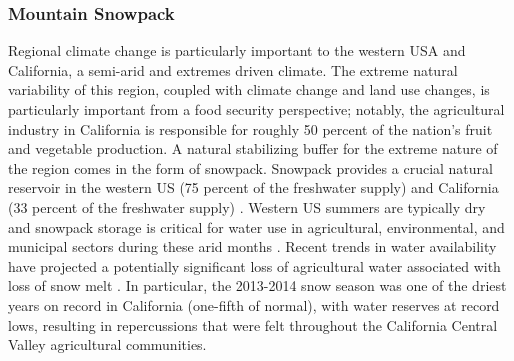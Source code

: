 \documentclass[11pt]{article}
\begin{document}
\subsubsection{Mountain Snowpack}

Regional climate change is particularly important to the western USA and California, a semi-arid and extremes driven climate.  The extreme natural variability of this region, coupled with climate change and land use changes, is particularly important from a food security perspective; notably, the agricultural industry in California is responsible for roughly 50 percent of the nation's fruit and vegetable production.  A natural stabilizing buffer for the extreme nature of the region comes in the form of snowpack. Snowpack provides a crucial natural reservoir in the western US (75 percent of the freshwater supply) and California (33 percent of the freshwater supply) \citep{cayan1996interannual}.  Western US summers are typically dry and snowpack storage is critical for water use in agricultural, environmental, and municipal sectors during these arid months \citep{dettinger1995large, mote_declining_2005, maurer2007detection}.  Recent trends in water availability have projected a potentially significant loss of agricultural water associated with loss of snow melt \citep{dyer2006spatial}. In particular, the 2013-2014 snow season was one of the driest years on record in California (one-fifth of normal), with water reserves at record lows, resulting in repercussions that were felt throughout the California Central Valley agricultural communities.

\end{document}
